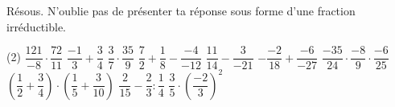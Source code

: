 %
%
    Résous. N'oublie pas de présenter ta réponse sous forme d'une fraction irréductible.
    \begin{tasks}(2)
        \task $\dfrac{121}{-8}\cdot\dfrac{72}{11}$
        \task $\dfrac{-1}{3}+\dfrac{3}{4}$
        \task $\dfrac{3}{7}\cdot\dfrac{35}{9}$
        \task $\dfrac{7}{2}+\dfrac{1}{8}-\dfrac{-4}{-12}$
        \task $\dfrac{11}{14} - \dfrac{3}{-21}$
        \task $-\dfrac{-2}{18}+\dfrac{-6}{-27}$
        \task $\dfrac{-35}{24}\cdot \dfrac{-8}{9} \cdot \dfrac{-6}{25}$
        \task $\left(\dfrac{1}{2}+\dfrac{3}{4}\right)\cdot \left(\dfrac{1}{5}+\dfrac{3}{10}\right)$
        \task $\dfrac{2}{15}-\dfrac{2}{3}:\dfrac{1}{4}$
        \task $\dfrac{3}{5}\cdot \left(\dfrac{-2}{3}\right)^2$
    \end{tasks}
